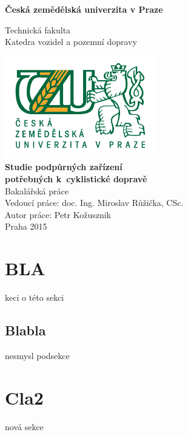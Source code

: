 \documentclass[a4paper,11pt]{article}
\begin{document}
\begin{titlepage}
    \begin{center}
        
        \textbf{Česká zemědělská univerzita v Praze}
        
        \vspace{0.5cm}
        Technická fakulta\\
        \vspace{0.5cm}
        Katedra vozidel a pozemní dopravy\\

        
        \vspace{0.8cm}
        
        \includegraphics[width=0.5\textwidth]{./logo}
        \vspace{1cm}\\
       \textbf{\LARGE Studie podpůrných zařízení\\
        potřebných k~cyklistické dopravě\\}
        \vspace{1cm}
        Bakalářská práce\\
        
        \vfill              
	    Vedoucí práce: doc. Ing. Miroslav Růžička, CSc.\\
        \vspace{0.5cm}
        Autor práce: Petr Kožusznik\\ 
        \vspace{0.5cm}
        Praha 2015\\
        
    \end{center}
\end{titlepage}

\tableofcontents
\newpage

\section{BLA}
keci o této sekci
	\subsection{Blabla}
	nesmysl podsekce	
\section{Cla2}
nová sekce
	
\end{document}
